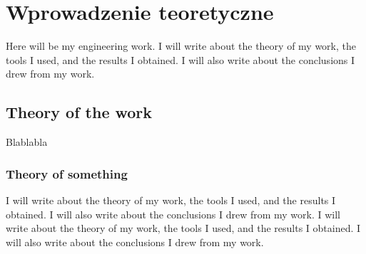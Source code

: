 \newpage
\section{Wprowadzenie teoretyczne}

Here will be my engineering work.
I will write about the theory of my work, the tools I used, and the results I obtained. I will also write about the conclusions I drew from my work.

\subsection{Theory of the work}

Blablabla

\subsubsection{Theory of something}
I will write about the theory of my work, the tools I used, and the results I obtained. I will also write about the conclusions I drew from my work.
I will write about the theory of my work, the tools I used, and the results I obtained. I will also write about the conclusions I drew from my work.
